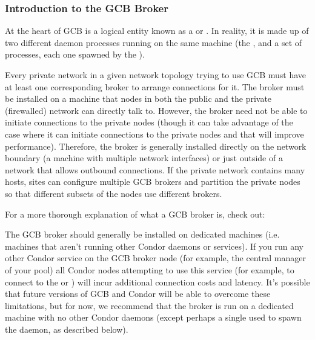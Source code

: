 \subsubsection{\label{sec:GCB-Broker-Intro}Introduction to the GCB Broker}

At the heart of GCB is a logical entity known as a  or
.
In reality, it is made up of two different daemon processes running on
the same machine (the , and a set of
 processes, each one spawned by the
).

Every private network in a given network topology trying to use GCB
must have at least one corresponding broker to arrange connections for
it.
The broker must be installed on a machine that nodes in both the
public and the private (firewalled) network can directly talk to.
However, the broker need not be able to initiate connections to the
private nodes (though it can take advantage of the case where it can
initiate connections to the private nodes and that will improve
performance). 
Therefore, the broker is generally installed directly on the network
boundary (a machine with multiple network interfaces) or just outside
of a network that allows outbound connections.
If the private network contains many hosts, sites can configure
multiple GCB brokers and partition the private nodes so that different
subsets of the nodes use different brokers.

For a more thorough explanation of what a GCB broker is, check out:

The GCB broker should generally be installed on dedicated machines
(i.e. machines that aren't running other Condor daemons or services).
If you run any other Condor service on the GCB broker node (for
example, the central manager of your pool) all Condor nodes attempting
to use this service (for example, to connect to the 
or ) will incur additional connection costs and
latency.
It's possible that future versions of GCB and Condor will be able to
overcome these limitations, but for now, we recommend that the broker
is run on a dedicated machine with no other Condor daemons (except
perhaps a single  used to spawn the 
daemon, as described below).

